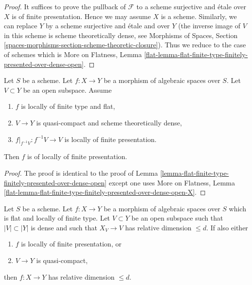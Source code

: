 \begin{proof}
It suffices to prove the pullback of $\mathcal{F}$ to a scheme surjective
and \'etale over $X$ is of finite presentation. Hence we may assume $X$
is a scheme. Similarly, we can replace $Y$ by a scheme surjective and
\'etale and over $Y$ (the inverse image of $V$ in this scheme is scheme
theoretically dense, see
Morphisms of Spaces, Section
\ref{spaces-morphisms-section-scheme-theoretic-closure}).
Thus we reduce to the case of schemes which is
More on Flatness, Lemma
\ref{flat-lemma-flat-finite-type-finitely-presented-over-dense-open}.
\end{proof}

\begin{lemma}
\label{lemma-flat-finite-type-finitely-presented-over-dense-open-X}
Let $S$ be a scheme.
Let $f : X \to Y$ be a morphism of algebraic spaces over $S$.
Let $V \subset Y$ be an open subspace.
Assume
\begin{enumerate}
\item $f$ is locally of finite type and flat,
\item $V \to Y$ is quasi-compact and scheme theoretically dense,
\item $f|_{f^{-1}V} : f^{-1}V \to V$ is locally of finite presentation.
\end{enumerate}
Then $f$ is of locally of finite presentation.
\end{lemma}

\begin{proof}
The proof is identical to the proof of
Lemma \ref{lemma-flat-finite-type-finitely-presented-over-dense-open}
except one uses
More on Flatness, Lemma
\ref{flat-lemma-flat-finite-type-finitely-presented-over-dense-open-X}.
\end{proof}

\begin{lemma}
\label{lemma-flat-finite-presentation-dimension-over-dense-open}
Let $S$ be a scheme. Let $f : X \to Y$ be a morphism of algebraic spaces
over $S$ which is flat and locally of finite type. Let $V \subset Y$ be an
open subspace such that $|V| \subset |Y|$ is dense and such that $X_V \to V$
has relative dimension $\leq d$. If also either
\begin{enumerate}
\item $f$ is locally of finite presentation, or
\item $V \to Y$ is quasi-compact,
\end{enumerate}
then $f : X \to Y$ has relative dimension $\leq d$.
\end{lemma}

